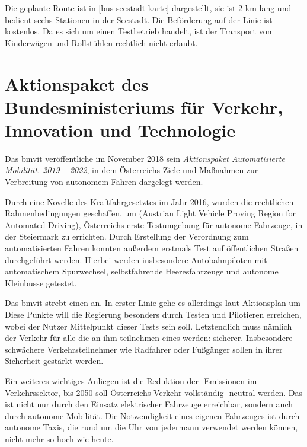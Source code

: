 Die geplante Route ist in \ref{bus-seestadt-karte} dargestellt, sie ist 2 \si{\kilo\metre} lang und bedient sechs Stationen in der Seestadt. Die Beförderung auf der Linie ist kostenlos. Da es sich um einen Testbetrieb handelt, ist der Transport von Kinderwägen und Rollstühlen rechtlich nicht erlaubt.


\section{Aktionspaket des Bundesministeriums für Verkehr, Innovation und Technologie}

Das \ac{bmvit} veröffentliche im November 2018 sein \emph{Aktionspaket Automatisierte Mobilität. 2019 -- 2022}, in dem Österreichs Ziele und Maßnahmen zur Verbreitung von autonomem Fahren dargelegt werden.

Durch eine Novelle des Kraftfahrgesetztes im Jahr 2016, wurden die rechtlichen Rahmenbedingungen geschaffen, um  (Austrian Light Vehicle Proving Region for Automated Driving), Österreichs erste Testumgebung für autonome Fahrzeuge, in der Steiermark zu errichten. Durch Erstellung der Verordnung zum automatisierten Fahren konnten außerdem erstmals Test auf öffentlichen Straßen durchgeführt werden. 
Hierbei werden insbesondere Autobahnpiloten mit automatischem Spurwechsel, selbstfahrende Heeresfahrzeuge und autonome Kleinbusse getestet.

Das \ac{bmvit} strebt einen  an. In erster Linie gehe es allerdings laut Aktionsplan um  Diese Punkte will die Regierung besonders durch Testen und Pilotieren erreichen, wobei der Nutzer Mittelpunkt dieser Tests sein soll. Letztendlich muss nämlich der Verkehr für alle die an ihm teilnehmen eines werden: sicherer. Insbesondere schwächere Verkehrsteilnehmer wie Radfahrer oder Fußgänger sollen in ihrer Sicherheit gestärkt werden.

Ein weiteres wichtiges Anliegen ist die Reduktion der -Emissionen im Verkehrssektor, bis 2050 soll Österreichs Verkehr vollständig -neutral werden. Das ist nicht nur durch den Einsatz elektrischer Fahrzeuge erreichbar, sondern auch durch autonome Mobilität. Die Notwendigkeit eines eigenen Fahrzeuges ist durch autonome Taxis, die rund um die Uhr von jedermann verwendet werden können, nicht mehr so hoch wie heute.

